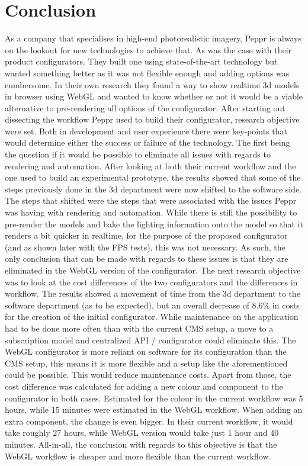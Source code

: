 \chapter{Conclusion}

As a company that specialises in high-end photorealistic imagery, Peppr is always on the lookout for new technologies to achieve that. As was the case with their product configurators. They built one using state-of-the-art technology but wanted something better as it was not flexible enough and adding options was cumbersome. In their own research they found a way to show realtime 3d models in browser using WebGL and wanted to know whether or not it would be a viable alternative to pre-rendering all options of the configurator. \newline
After starting out dissecting the workflow Peppr used to build their configurator, research objective were set. Both in development and user experience there were key-points that would determine either the success or failure of the technology. The first being the question if it would be possible to eliminate all issues with regards to rendering and automation. After looking at both their current workflow and the one used to build an experimental prototype, the results showed that some of the steps previously done in the 3d department were now shifted to the software side. The steps that shifted were the steps that were associated with the issues Peppr was having with rendering and automation. While there is still the possibility to pre-render the models and bake the lighting information onto the model so that it renders a bit quicker in realtime, for the purpose of the proposed configurator (and as shown later with the FPS tests), this was not necessary. As such, the only conclusion that can be made with regards to these issues is that they are eliminated in the WebGL version of the configurator.\newline
The next research objective was to look at the cost differences of the two configurators and the differences in workflow. The results showed a movement of time from the 3d department to the software department (as to be expected), but an overall decrease of 8.6\% in costs for the creation of the initial configurator. While maintenance on the application had to be done more often than with the current CMS setup, a move to a subscription model and centralized API / configurator could eliminate this. The WebGL configurator is more reliant on software for its configuration than the CMS setup, this means it is more flexible and a setup like the aforementioned could be possible. This would reduce maintenance costs. Apart from those, the cost difference was calculated for adding a new colour and component to the configurator in both cases. Estimated for the colour in the current workflow was 5 hours, while 15 minutes were estimated in the WebGL workflow. When adding an extra component, the change is even bigger. In their current workflow, it would take roughly 27 hours, while WebGL version would take just 1 hour and 40 minutes. All-in-all, the conclusion with regards to this objective is that the WebGL workflow is cheaper and more flexible than the current workflow.\newline

